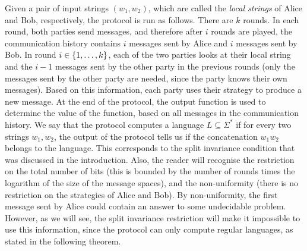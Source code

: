 Given a pair of input strings $(w_1,w_2)$, which are called the \emph{local strings} of Alice and Bob, respectively, the  protocol is run as follows. There are $k$ rounds. In each round, both parties send messages, and therefore after $i$ rounds are played, the communication history contains $i$ messages sent by Alice and $i$ messages sent by Bob.  In round  $i \in \{1,\ldots,k\}$,  each of the two parties  looks at their local string and the $i-1$ messages sent by the other party in the previous rounds (only the messages sent by the other party are needed, since the party knows their own messages). Based on this information, each party uses their strategy to produce a new message. At the end of the protocol, the output function is used to determine the value of the function, based on all messages in  the communication history. We say that the protocol computes a language $L \subseteq \Sigma^*$ if for every two strings $w_1,w_2$, the output of the protocol tells us if the concatenation $w_1w_2$ belongs to the language. This corresponds to the split invariance condition that was discussed in the introduction.  Also, the reader will recognise the restriction on the total number of bits (this is bounded by the number of rounds times the logarithm of the size of the message spaces), and the non-uniformity (there is no restriction on the strategies of Alice and Bob). By non-uniformity, the first message sent by Alice could contain an answer to some undecidable problem. However, as we will see, the split invariance restriction will make it impossible to use this information, since the protocol can only compute regular languages, as stated in the following theorem.




